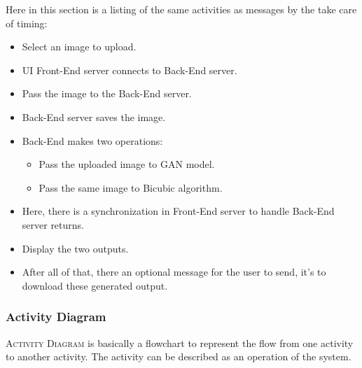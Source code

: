 \documentclass[12pt]{article}
\begin{document}
				Here in this section is a listing of the same activities as messages by the take care of timing:
				\begin{itemize}
					\item Select an image to upload.
					\item UI Front-End server connects to Back-End server.
					\item Pass the image to the Back-End server.
					\item Back-End server saves the image.
					\item Back-End makes two operations:
						\begin{itemize}
							\item Pass the uploaded image to GAN model.
							\item Pass the same image to Bicubic algorithm.
						\end{itemize}
					\item Here, there is a synchronization in Front-End server to handle Back-End server returns.
					\item Display the two outputs.
					\item After all of that, there an optional message for the user to send, it's to download these generated output.
				\end{itemize}
			\subsubsection{Activity Diagram}
				\textsc{Activity Diagram} is basically a flowchart to represent the flow from one activity to another activity. The activity can be described as an operation of the system. 
				
\end{document}
